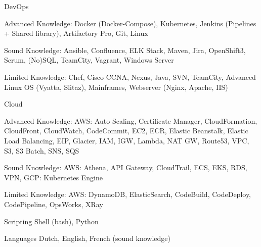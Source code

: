 

\begin{cvskills}

  \cvskill
    {DevOps} %
    {
      \begin{cvitems} %
        \item {Advanced Knowledge: Docker (Docker-Compose), Kubernetes, Jenkins (Pipelines + Shared library), Artifactory Pro, Git, Linux}
        \item {Sound Knowledge: Ansible, Confluence, ELK Stack, Maven, Jira, OpenShift3, Scrum, (No)SQL, TeamCity, Vagrant, Windows Server}
        \item {Limited Knowledge: Chef, Cisco CCNA, Nexus, Java, SVN, TeamCity, Advanced Linux OS (Vyatta, Slitaz), Mainframes, Webserver (Nginx, Apache, IIS)}
      \end{cvitems}
    }

  \cvskill
    {Cloud} %
    {
      \begin{cvitems} %
        \item {Advanced Knowledge: AWS: Auto Scaling, Certificate Manager, CloudFormation, CloudFront, CloudWatch, CodeCommit, EC2, ECR, Elastic Beanstalk, Elastic Load Balancing, EIP, Glacier, IAM, IGW, Lambda, NAT GW, Route53, VPC, S3, S3 Batch, SNS, SQS}
        \item {Sound Knowledge: AWS: Athena, API Gateway, CloudTrail, ECS, EKS, RDS, VPN, GCP: Kubernetes Engine}
        \item {Limited Knowledge: AWS: DynamoDB, ElasticSearch, CodeBuild, CodeDeploy, CodePipeline, OpsWorks, XRay}
      \end{cvitems}
    }

  \cvskill
    {Scripting} %
    {Shell (bash), Python} %

  \cvskill
    {Languages} %
    {Dutch, English, French (sound knowledge)} %

\end{cvskills}
